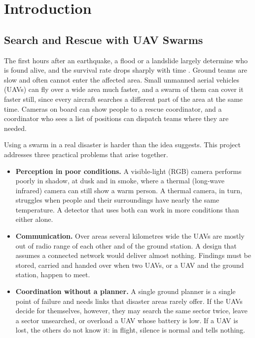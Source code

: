 \documentclass[10pt,letterpaper]{article}
\begin{document}
\tableofcontents
\clearpage

\section{Introduction}
\subsection{Search and Rescue with UAV Swarms}
The first hours after an earthquake, a flood or a landslide largely determine who is found alive, and the survival rate drops sharply with time \cite{speth2022}. Ground teams are slow and often cannot enter the affected area. Small unmanned aerial vehicles (UAVs) can fly over a wide area much faster, and a swarm of them can cover it faster still, since every aircraft searches a different part of the area at the same time. Cameras on board can show people to a rescue coordinator, and a coordinator who sees a list of positions can dispatch teams where they are needed.

Using a swarm in a real disaster is harder than the idea suggests. This project addresses three practical problems that arise together.
\begin{itemize}
\item \textbf{Perception in poor conditions.} A visible-light (RGB) camera performs poorly in shadow, at dusk and in smoke, where a thermal (long-wave infrared) camera can still show a warm person. A thermal camera, in turn, struggles when people and their surroundings have nearly the same temperature. A detector that uses both can work in more conditions than either alone.
\item \textbf{Communication.} Over areas several kilometres wide the UAVs are mostly out of radio range of each other and of the ground station. A design that assumes a connected network would deliver almost nothing. Findings must be stored, carried and handed over when two UAVs, or a UAV and the ground station, happen to meet.
\item \textbf{Coordination without a planner.} A single ground planner is a single point of failure and needs links that disaster areas rarely offer. If the UAVs decide for themselves, however, they may search the same sector twice, leave a sector unsearched, or overload a UAV whose battery is low. If a UAV is lost, the others do not know it: in flight, silence is normal and tells nothing.
\end{itemize}
\end{document}
